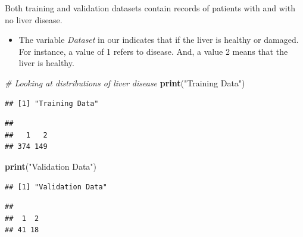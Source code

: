 \documentclass[]{article}
\newenvironment{Shaded}{\begin{snugshade}}{\end{snugshade}}
\newcommand{\CommentTok}[1]{\textcolor[rgb]{0.56,0.35,0.01}{\textit{#1}}}
\newcommand{\KeywordTok}[1]{\textcolor[rgb]{0.13,0.29,0.53}{\textbf{#1}}}
\newcommand{\NormalTok}[1]{#1}
\newcommand{\OperatorTok}[1]{\textcolor[rgb]{0.81,0.36,0.00}{\textbf{#1}}}
\newcommand{\StringTok}[1]{\textcolor[rgb]{0.31,0.60,0.02}{#1}}
\begin{document}
Both training and validation datasets contain records of patients with
and with no liver disease.

\begin{itemize}
\item The variable \emph{Dataset} in our indicates that if the liver is healthy or damaged. For instance, a value of 1 refers to disease. And, a value 2 means that the liver is healthy.
\end{itemize}

\begin{Shaded}
\begin{Highlighting}[]
\CommentTok{# Looking at distributions of liver disease}
\KeywordTok{print}\NormalTok{(}\StringTok{"Training Data"}\NormalTok{)}
\end{Highlighting}
\end{Shaded}

\begin{verbatim}
## [1] "Training Data"
\end{verbatim}

\begin{Shaded}
\end{Shaded}

\begin{verbatim}
## 
##   1   2 
## 374 149
\end{verbatim}

\begin{Shaded}
\begin{Highlighting}[]
\KeywordTok{print}\NormalTok{(}\StringTok{"Validation Data"}\NormalTok{)}
\end{Highlighting}
\end{Shaded}

\begin{verbatim}
## [1] "Validation Data"
\end{verbatim}

\begin{Shaded}
\end{Shaded}

\begin{verbatim}
## 
##  1  2 
## 41 18
\end{verbatim}
\end{document}
